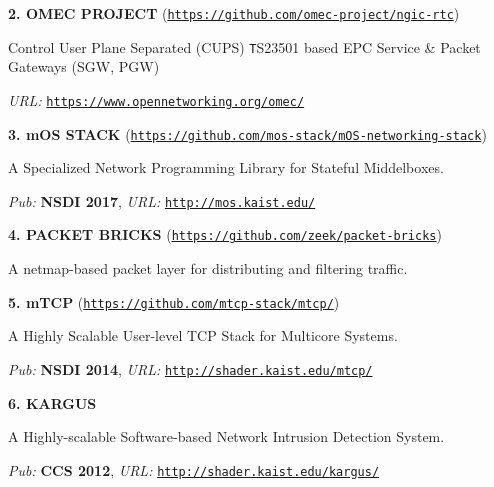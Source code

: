 \documentclass[10pt]{article}
\newenvironment{innerlist}[1][\enskip\textbullet]%
        {\begin{compactitem}[#1]}{\end{compactitem}}
\begin{document}
{\textbf{2. O{\footnotesize MEC} P{\footnotesize ROJECT}}} (\href{https://github.com/omec-project/ngic-rtc}{\texttt{https://github.com/omec-project/ngic-rtc}})
\begin{innerlist}
\item {Control User Plane Separated (CUPS) {\texttt TS23501} based EPC Service \& Packet Gateways (SGW, PGW)}
\item {\textit{URL:} \href{https://www.opennetworking.org/omec/}{\texttt{https://www.opennetworking.org/omec/}}}
\end{innerlist}

{\textbf{3. m{OS} S{\footnotesize TACK}}} (\href{https://github.com/mos-stack/mOS-networking-stack}{\texttt{https://github.com/mos-stack/mOS-networking-stack}})
\begin{innerlist}
\item {A Specialized Network Programming Library for Stateful Middelboxes.}
\item {\textit{Pub:} {\bf NSDI 2017}, \textit{URL:} \href{http://mos.kaist.edu/}{\texttt{http://mos.kaist.edu/}}}
\end{innerlist} 

{\textbf{4. P{\footnotesize ACKET} B{\footnotesize RICKS}}} (\href{https://github.com/zeek/packet-bricks}{\texttt{https://github.com/zeek/packet-bricks}})
\begin{innerlist}
\item {A netmap-based packet layer for distributing and filtering traffic.}
\end{innerlist} 

{\textbf{5. m{TCP}}} (\href{https://github.com/mtcp-stack/mtcp/}{\texttt{https://github.com/mtcp-stack/mtcp/}})
\begin{innerlist}
\item {A Highly Scalable User-level TCP Stack for Multicore Systems.}
\item {\textit{Pub:} {\bf NSDI 2014}, \textit{URL:} \href{http://shader.kaist.edu/mtcp/}{\texttt{http://shader.kaist.edu/mtcp/}}}
\end{innerlist}

{\textbf{6. K{\footnotesize ARGUS}}}
\begin{innerlist}
\item {A Highly-scalable Software-based Network Intrusion Detection System.}
\item {\textit{Pub:} {\bf CCS 2012}, \textit{URL:} \href{http://shader.kaist.edu/kargus/}{\texttt{http://shader.kaist.edu/kargus/}}}
\end{innerlist}
\end{document}
